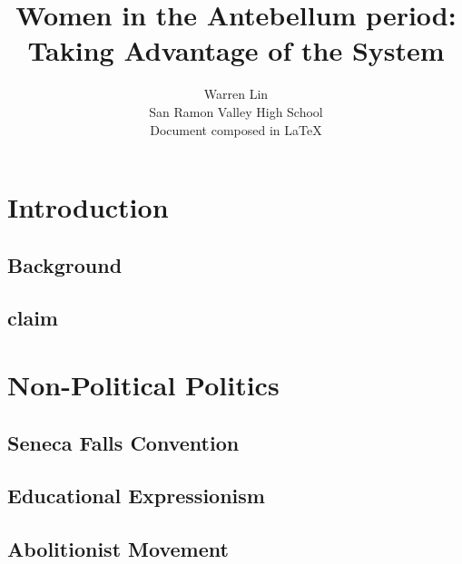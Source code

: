\documentclass{article}
\title{Women in the Antebellum period: Taking Advantage of the System}
\author{Warren Lin\\ San Ramon Valley High School \\ Document composed in \LaTeX{}}
\begin{document}
\maketitle
\newpage

\begin{abstract}


\end{abstract}

\newpage

\doublespacing
\tableofcontents
\singlespacing

\newpage

\section{Introduction}
\subsection{Background}
\subsection{claim}

\section{Non-Political Politics}
\subsection{Seneca Falls Convention}
\subsection{Educational Expressionism}
\subsection{Abolitionist Movement}

\end{document}
